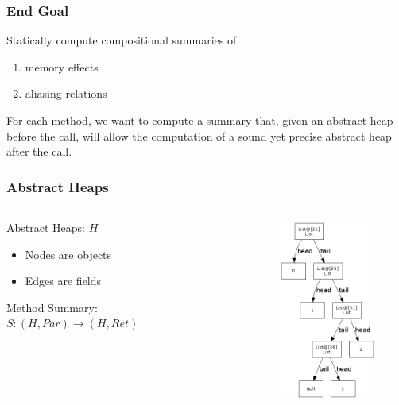 \documentclass[hyperref={pdfpagelabels=false}]{beamer}
\begin{document}
\begin{frame}
\frametitle{End Goal}
    Statically compute compositional summaries of
    \begin{enumerate}
        \item memory effects
        \item aliasing relations
    \end{enumerate}

    \vspace{25pt}
    For each method, we want to compute a summary that, given an abstract heap
    before the call, will allow the computation of a sound yet precise abstract
    heap after the call.
\end{frame}

\begin{frame}
\frametitle{Abstract Heaps}
  \begin{columns}
    \begin{column}{0.4\textwidth}

        Abstract Heaps: $H$
        \begin{itemize}
            \item Nodes are objects
            \item Edges are fields
        \end{itemize}

        \vspace{10pt}
        Method Summary:
        $S : (H, Par) \rightarrow (H, Ret)$


    \end{column}
    \begin{column}{0.6\textwidth}
      \begin{figure}[t]
            \includegraphics[height=60mm]{images/heap.png}\\
      \end{figure}
    \end{column}
  \end{columns}
\end{frame}
\end{document}
